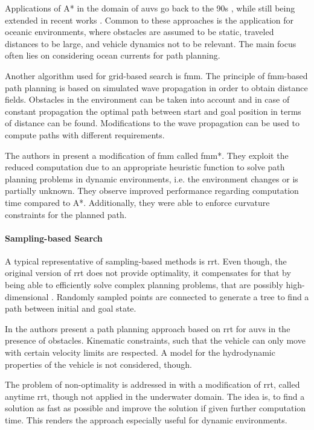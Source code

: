 Applications of A* in the domain of \acp{auv} go back to the 90s \cite{Carroll92}, while still being extended in recent works \cite{zhang20}. Common to these approaches is the application for oceanic environments, where obstacles are assumed to be static, traveled distances to be large, and vehicle dynamics not to be relevant. The main focus often lies on considering ocean currents for path planning.

Another algorithm used for grid-based search is \ac{fmm}. The principle of \acs{fmm}-based path planning is based on simulated wave propagation in order to obtain distance fields. Obstacles in the environment can be taken into account and in case of constant propagation the optimal path between start and goal position in terms of distance can be found. Modifications to the wave propagation can be used to compute paths with different requirements.

The authors in \cite{Petres09} present a modification of \ac{fmm} called \acs{fmm}*. They exploit the reduced computation due to an appropriate heuristic function to solve path planning problems in dynamic environments, i.e. the environment changes or is partially unknown. They observe improved performance regarding computation time compared to A*. Additionally, they were able to enforce curvature constraints for the planned path.

\paragraph{Sampling-based Search}

A typical representative of sampling-based methods is \ac{rrt}. Even though, the original version of \ac{rrt} does not provide optimality, it compensates for that by being able to efficiently solve complex planning problems, that are possibly high-dimensional \cite{Devaurs16}. Randomly sampled points are connected to generate a tree to find a path between initial and goal state.

In \cite{Young13} the authors present a path planning approach based on \ac{rrt} for \acp{auv} in the presence of obstacles. Kinematic constraints, such that the vehicle can only move with certain velocity limits are respected. A model for the hydrodynamic properties of the vehicle is not considered, though.

The problem of non-optimality is addressed in \cite{Karaman11} with a modification of \ac{rrt}, called anytime \ac{rrt}, though not applied in the underwater domain. The idea is, to find a solution as fast as possible and improve the solution if given further computation time. This renders the approach especially useful for dynamic environments.

